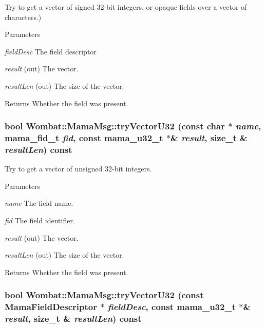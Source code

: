 Try to get a vector of signed 32-\/bit integers. or opaque fields over a vector of characters.) 
\begin{DoxyParams}{Parameters}
\item[{\em fieldDesc}]The field descriptor \item[{\em result}](out) The vector. \item[{\em resultLen}](out) The size of the vector. \end{DoxyParams}
\begin{DoxyReturn}{Returns}
Whether the field was present. 
\end{DoxyReturn}
\hypertarget{classWombat_1_1MamaMsg_a2b74035c93d667e19ca56bb1eddd85dd}{
\subsubsection[{tryVectorU32}]{\setlength{\rightskip}{0pt plus 5cm}bool Wombat::MamaMsg::tryVectorU32 (const char $\ast$ {\em name}, \/  mama\_\-fid\_\-t {\em fid}, \/  const mama\_\-u32\_\-t $\ast$\& {\em result}, \/  size\_\-t \& {\em resultLen}) const}}
\label{classWombat_1_1MamaMsg_a2b74035c93d667e19ca56bb1eddd85dd}


Try to get a vector of unsigned 32-\/bit integers. 
\begin{DoxyParams}{Parameters}
\item[{\em name}]The field name. \item[{\em fid}]The field identifier. \item[{\em result}](out) The vector. \item[{\em resultLen}](out) The size of the vector. \end{DoxyParams}
\begin{DoxyReturn}{Returns}
Whether the field was present. 
\end{DoxyReturn}
\hypertarget{classWombat_1_1MamaMsg_a3fc07cd71a28123e180fcda7d48da22e}{
\subsubsection[{tryVectorU32}]{\setlength{\rightskip}{0pt plus 5cm}bool Wombat::MamaMsg::tryVectorU32 (const {\bf MamaFieldDescriptor} $\ast$ {\em fieldDesc}, \/  const mama\_\-u32\_\-t $\ast$\& {\em result}, \/  size\_\-t \& {\em resultLen}) const}}
\label{classWombat_1_1MamaMsg_a3fc07cd71a28123e180fcda7d48da22e}


